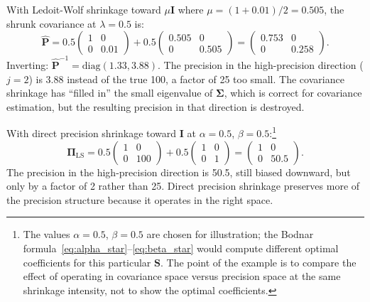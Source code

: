 With Ledoit-Wolf shrinkage toward $\mu\mathbf{I}$ where $\mu = (1 + 0.01)/2 = 0.505$, the shrunk covariance at $\lambda = 0.5$ is:
\begin{equation*}
\hat{\mathbf{P}} = 0.5 \begin{pmatrix} 1 & 0 \\ 0 & 0.01 \end{pmatrix} + 0.5 \begin{pmatrix} 0.505 & 0 \\ 0 & 0.505 \end{pmatrix} = \begin{pmatrix} 0.753 & 0 \\ 0 & 0.258 \end{pmatrix}.
\end{equation*}
Inverting: $\hat{\mathbf{P}}^{-1} = \text{diag}(1.33, 3.88)$. The precision in the high-precision direction ($j = 2$) is 3.88 instead of the true 100, a factor of 25 too small. The covariance shrinkage has ``filled in'' the small eigenvalue of $\boldsymbol{\Sigma}$, which is correct for covariance estimation, but the resulting precision in that direction is destroyed.

With direct precision shrinkage toward $\mathbf{I}$ at $\alpha = 0.5$, $\beta = 0.5$:\footnote{The values $\alpha = 0.5$, $\beta = 0.5$ are chosen for illustration; the Bodnar formula~\eqref{eq:alpha_star}--\eqref{eq:beta_star} would compute different optimal coefficients for this particular $\mathbf{S}$. The point of the example is to compare the effect of operating in covariance space versus precision space at the same shrinkage intensity, not to show the optimal coefficients.}
\begin{equation*}
\boldsymbol{\Pi}_{\text{LS}} = 0.5 \begin{pmatrix} 1 & 0 \\ 0 & 100 \end{pmatrix} + 0.5 \begin{pmatrix} 1 & 0 \\ 0 & 1 \end{pmatrix} = \begin{pmatrix} 1 & 0 \\ 0 & 50.5 \end{pmatrix}.
\end{equation*}
The precision in the high-precision direction is 50.5, still biased downward, but only by a factor of 2 rather than 25. Direct precision shrinkage preserves more of the precision structure because it operates in the right space.

